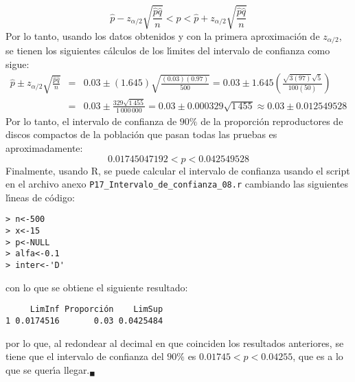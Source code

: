 \begin{solucion}
 \begin{equation*}
  \hat{p} - z_{\alpha/2}\sqrt{\frac{\hat{p}\hat{q}}{n}} < p < \hat{p} + z_{\alpha/2} \sqrt{\frac{\hat{p}\hat{q}}{n}}
 \end{equation*}
 Por lo tanto, usando los datos obtenidos y con la primera aproximaci\'on de $z_{\alpha/2}$, se tienen los siguientes c\'alculos de los l\'{\i}mites del intervalo de confianza como sigue:
 \begin{eqnarray*}
  \hat{p} \pm z_{\alpha/2}\sqrt{\frac{\hat{p}\hat{q}}{n}} & = & 0.03 \pm(1.645)\sqrt{\frac{(0.03)(0.97)}{500}} = 0.03 \pm 1.645 \left( \frac{\sqrt{3(97)}\sqrt{5}}{100(50)} \right) \\
  & = & 0.03 \pm \frac{329\sqrt{1\,455}}{1\,000\,000} = 0.03 \pm 0.000329\sqrt{1\,455} \approx 0.03 \pm 0.012549528
 \end{eqnarray*}
 Por lo tanto, el intervalo de confianza de $90\%$ de la proporci\'on reproductores de discos compactos de la poblaci\'on que pasan todas las pruebas es aproximadamente:
 \begin{equation*}
  0.01745047192 < p < 0.042549528
 \end{equation*}
 Finalmente, usando R, se puede calcular el intervalo de confianza usando el script en el archivo anexo \texttt{P17\_Intervalo\_de\_confianza\_08.r} cambiando las siguientes l\'{\i}neas de c\'odigo:
 \begin{verbatim}
> n<-500
> x<-15
> p<-NULL
> alfa<-0.1
> inter<-'D'
 \end{verbatim}
 \vspace{-0.5cm}
 con lo que se obtiene el siguiente resultado:
 \begin{verbatim}
     LimInf Proporción    LimSup
1 0.0174516       0.03 0.0425484
 \end{verbatim}
 \vspace{-0.5cm}
 por lo que, al redondear al decimal en que coinciden los resultados anteriores, se tiene que el intervalo de confianza del $90\%$ es $0.01745 < p < 0.04255$, que es a lo que se quer\'{\i}a llegar.${}_{\blacksquare}$
\end{solucion}
